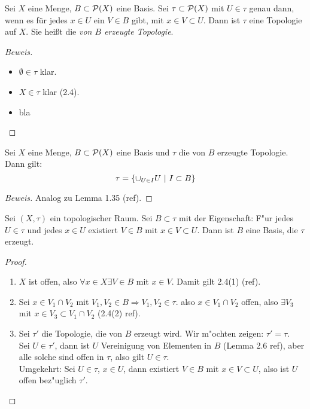 \documentclass{skript}
\begin{document}
\begin{stz}
    Sei $X$ eine Menge, $B\subset\mathcal{P}(X)$ eine Basis. Sei
    $\tau\subset\mathcal{P}(X)$ mit $U\in\tau$ genau dann, wenn es für jedes $x\in U$
    ein $V\in B$ gibt, mit $x\in V\subset U$. Dann ist $\tau$ eine Topologie auf $X$.
    Sie heißt die \emph{von $B$ erzeugte Topologie}.

    \begin{proof}[Beweis]
        \begin{itemize}
            \item $\emptyset\in\tau$ klar.
            \item $X\in\tau$ klar (2.4).
            \item bla
        \end{itemize}
    \end{proof}

\end{stz}

\begin{lem}
    Sei $X$ eine Menge, $B\subset\mathcal{P}(X)$ eine Basis und $\tau$ die von $B$
    erzeugte Topologie. Dann gilt: \[\tau = \mdef[\cup_{U\in I}U]{I\subset B}\]

    \begin{proof}[Beweis]
        Analog zu Lemma 1.35 (ref).
    \end{proof}
\end{lem}

\begin{lem}
    Sei $(X, \tau)$ ein topologischer Raum. Sei $B\subset \tau$ mit der Eigenschaft:
    F"ur jedes $U\in \tau$ und jedes $x\in U$ existiert $V\in B$ mit $x\in V\subset U$.
    Dann ist $B$ eine Basis, die $\tau$ erzeugt.

    \begin{proof}
        \begin{enumerate}
            \item $X$ ist offen, also $\forall x\in X \exists V\in B$ mit $x\in V$.
                Damit gilt 2.4(1) (ref).
            \item Sei $x\in V_1\cap V_2$ mit $V_1, V_2 \in B \Rightarrow V_1, V_2 \in \tau$.
                also $x\in V_1\cap V_2$ offen, also $\exists V_3$ mit
                $x\in V_3\subset V_1\cap V_2$ (2.4(2) ref).
            \item Sei $\tau'$ die Topologie, die von $B$ erzeugt wird. Wir m"ochten zeigen:
                $\tau' = \tau$.\\
                Sei $U\in\tau'$, dann ist $U$ Vereinigung von Elementen in $B$
                (Lemma 2.6 ref),
                aber alle solche sind offen in $\tau$, also gilt $U\in\tau$.\\
                Umgekehrt: Sei $U\in\tau$, $x\in U$, dann existiert $V\in B$ mit
                $x\in V\subset U$, also ist $U$ offen bez"uglich $\tau'$.
        \end{enumerate}
    \end{proof}
\end{lem}
\end{document}

